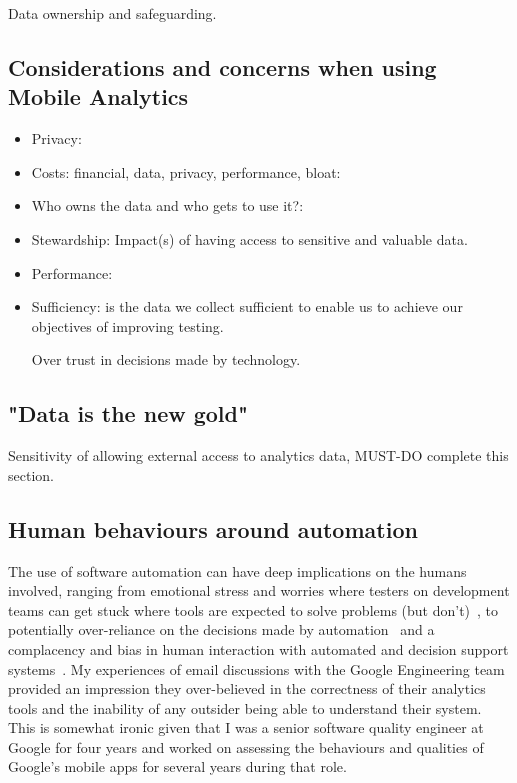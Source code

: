 Data ownership and safeguarding.

\subsection{Considerations and concerns when using Mobile Analytics}
\begin{itemize}
    \item Privacy:
    \item Costs: financial, data, privacy, performance, bloat:
    \item Who owns the data and who gets to use it?:
    \item Stewardship: Impact(s) of having access to sensitive and valuable data.
    \item Performance:
    \item Sufficiency: is the data we collect sufficient to enable us to achieve our objectives of improving testing.
    \item [Over] trust in decisions made by technology.
\end{itemize}


\subsection{"Data is the new gold"}

Sensitivity of allowing external access to analytics data, MUST-DO complete this section. 

\subsection{Human behaviours around automation}
The use of software automation can have deep implications on the humans involved, ranging from emotional stress and worries where testers on development teams can get stuck where tools are expected to solve problems (but don't)~\cite{evans2020stuck}, to potentially over-reliance on the decisions made by automation~\cite{cummings2004automation} and a complacency and bias in human interaction with automated and decision support systems~\cite{parasuraman_complacency_and_bias_in_human_use_of_automation}. 
My experiences of email discussions with the Google Engineering team provided an impression they over-believed in the correctness of their analytics tools and the inability of any outsider 
being able to understand their system. This is somewhat ironic given that I was a senior software quality engineer at Google for four years and worked on assessing the behaviours and qualities of Google's mobile apps for several years during that role.

